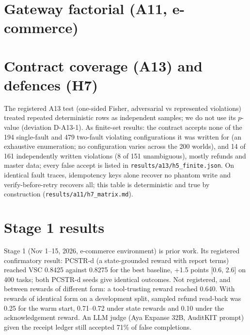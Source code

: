 \section{Gateway factorial (A11, e-commerce)}
\label{app:a11}

\begin{table}[h]
\centering
\resizebox{\columnwidth}{!}{}
\caption{A11 (registered; Stage 1 e-commerce environment, 300 tasks): system-level verified completion per gateway mode. $I$: registered interaction (policy effect under Enforce minus under Passthrough); it excludes zero for PCSTR-d seed 0 only, so the registered claim, which required both seeds, is not made. The runtime check ($\Delta_\text{runtime}>0$ for every policy) passes.}
\end{table}

\section{Contract coverage (A13) and defences (H7)}
\label{app:a13}

The registered A13 test (one-sided Fisher, adversarial vs represented violations) treated repeated deterministic rows as independent samples; we do not use its $p$-value (deviation D-A13-1). As finite-set results: the contract accepts none of the 194 single-fault and 479 two-fault violating configurations it was written for (an exhaustive enumeration; no configuration varies across the 200 worlds), and 14 of 161 independently written violations (8 of 151 unambiguous), mostly refunds and master data; every false accept is listed in \texttt{results/a13/h5\_finite.json}. On identical fault traces, idempotency keys alone recover no phantom write and verify-before-retry recovers all; this table is deterministic and true by construction (\texttt{results/a11/h7\_matrix.md}).

\section{Stage 1 results}
\label{app:stage1}

Stage 1 (Nov 1--15, 2026, e-commerce environment) is prior work. Its registered confirmatory result: PCSTR-d (a state-grounded reward with report terms) reached VSC 0.8425 against 0.8275 for the best baseline, +1.5 points [0.6, 2.6] on 400 tasks; both PCSTR-d seeds give identical outcomes. Not registered, and between rewards of different form: a tool-trusting reward reached 0.640. With rewards of identical form on a development split, sampled refund read-back was 0.25 for the warm start, 0.71--0.72 under state rewards and 0.10 under the acknowledgement reward. An LLM judge (Aya Expanse 32B, AuditKIT prompt) given the receipt ledger still accepted 71\% of false completions.


